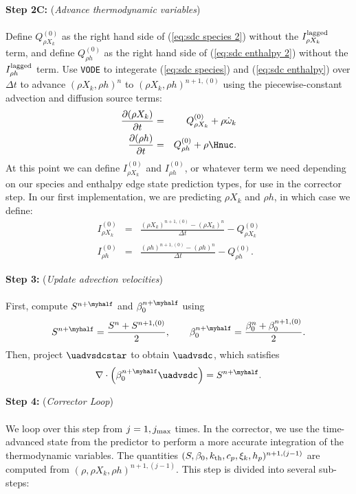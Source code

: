 {\bf Step 2C:} ({\it Advance thermodynamic variables})\\ \\
Define $Q_{\rho X_k}^{(0)}$ as the right hand side of (\ref{eq:sdc species 2}) without the $I_{\rho X_k}^{\rm lagged}$ term, and define $Q_{\rho h}^{(0)}$ as the right hand side of (\ref{eq:sdc enthalpy 2}) without the $I_{\rho h}^{\rm lagged}$ term.  Use {\tt VODE} to integerate (\ref{eq:sdc species}) and (\ref{eq:sdc enthalpy}) over $\Delta t$ to advance $(\rho X_k, \rho h)^n$ to $(\rho X_k, \rho h)^{n+1,(0)}$ using the piecewise-constant advection and diffusion source terms:
\begin{eqnarray}
\frac{\partial(\rho X_k)}{\partial t} &=& Q_{\rho X_k}^{(0)} + \rho\dot\omega_k\\
\frac{\partial(\rho h)}{\partial t} &=& Q_{\rho h}^{(0)} + \rho\Hnuc.
\end{eqnarray}
At this point we can define $I_{\rho X_k}^{(0)}$ and $I_{\rho h}^{(0)}$, or whatever term we need depending on our species and enthalpy edge state prediction types, for use in the corrector step.  In our first implementation, we are predicting $\rho X_k$ and $\rho h$, in which case we define:
\begin{eqnarray}
I_{\rho X_k}^{(0)} &=& \frac{(\rho X_k)^{n+1,(0)} - (\rho X_k)^n}{\Delta t} - Q_{\rho X_k}^{(0)}\\
I_{\rho h}^{(0)} &=& \frac{(\rho h)^{n+1,(0)} - (\rho h)^n}{\Delta t} - Q_{\rho h}^{(0)}.
\end{eqnarray}

{\bf Step 3:} ({\it Update advection velocities})\\ \\
First, compute $S^{n+\myhalf}$ and $\beta_0^{n+\myhalf}$ using
\begin{equation}
S^{n+\myhalf} = \frac{S^n + S^{n+1,(0)}}{2}, \qquad \beta_0^{n+\myhalf} = \frac{\beta_0^n + \beta_0^{n+1,(0)}}{2}.
\end{equation}
Then, project $\uadvsdcstar$ to obtain $\uadvsdc$, which satisfies
\begin{equation}
\nabla\cdot\left(\beta_0^{n+\myhalf}\uadvsdc\right) = S^{n+\myhalf}.
\end{equation}

{\bf Step 4:} ({\it Corrector Loop})\\ \\
We loop over this step from $j=1,j_{\rm max}$ times.  In the corrector, we use the time-advanced state from the predictor to perform a more accurate integration of the thermodynamic variables.  The quantities $(S, \beta_0, k_{\rm th}, c_p, \xi_k, h_p)^{n+1,(j-1)}$ are computed from $(\rho,\rho X_k,\rho h)^{n+1,(j-1)}$.  This step is divided into several sub-steps:\\

